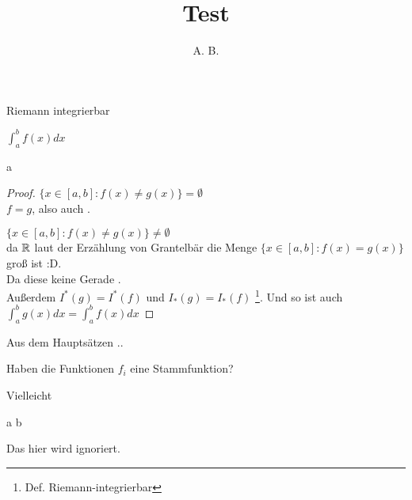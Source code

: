 \documentclass[]{article}
\title{Test}
\author{A. B.}
\begin{document}
\maketitle

\begin{task}
	\begin{task-todo}
		\item Riemann integrierbar
		\item $\int_{a}^{b} f(x) dx$
	\end{task-todo}
	
	\begin{subtask}{a}
		\begin{proof}
			$\{ x \in [a,b]: f(x) \neq g(x) \} = \emptyset $ \\
			\Implies $f = g$, also auch .
			
			$\{ x \in [a,b]: f(x) \neq g(x) \} \neq \emptyset $ \\
			da $\mathbin{\mathbb{R}}$ laut der Erzählung von Grantelbär die Menge 
			$\{ x \in [a,b]: f(x) = g(x) \}$ groß ist :D.\\
			
			Da diese keine Gerade .\\
			
			Außerdem $I^*(g) = I^*(f)$ und $I_*(g) = I_*(f)$ \footnote{Def. Riemann-integrierbar}.
			Und so ist auch $\int_{a}^{b} g(x) dx = \int_{a}^{b} f(x) dx$
		\end{proof}
	\end{subtask}
\end{task}

\begin{task}
	\begin{remark}
		Aus dem Hauptsätzen .. 
	\end{remark}

	\begin{task-todo}
		\item Haben die Funktionen $f_i$ eine Stammfunktion?
	\end{task-todo}

	Vielleicht
	\begin{Eq*}
		a \limplies b
	\end{Eq*}

	\begin{ignore}
		Das hier wird ignoriert.
	\end{ignore}
\end{task}
\end{document}
